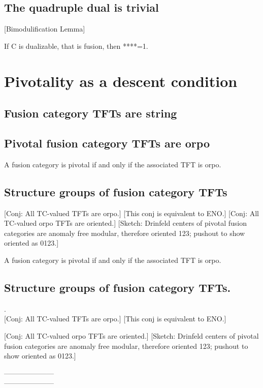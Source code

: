 \documentclass{amsart}
\begin{document}
\subsection{The quadruple dual is trivial}
[Bimodulification Lemma]
\begin{theorem} 
If C is dualizable, that is fusion, then ****=1.
\end{theorem}
%

\section{Pivotality as a descent condition}

\subsection{Fusion category TFTs are string}
\subsection{Pivotal fusion category TFTs are orpo}
\begin{theorem}
A fusion category is pivotal if and only if the associated TFT is orpo.
\end{theorem}
\subsection{Structure groups of fusion category TFTs}
   [Conj: All TC-valued TFTs are orpo.] [This conj is equivalent to ENO.]
   [Conj: All TC-valued orpo TFTs are oriented.] [Sketch: Drinfeld centers of pivotal fusion categories are anomaly free modular, therefore oriented 123; pushout to show oriented as 0123.]

\begin{theorem}
A fusion category is pivotal if and only if the associated TFT is orpo.
\end{theorem}

\subsection{Structure groups of fusion category TFTs.} .\\

	[Conj: All TC-valued TFTs are orpo.] [This conj is equivalent to ENO.]
	
	[Conj: All TC-valued orpo TFTs are oriented.] [Sketch: Drinfeld centers of pivotal fusion categories are anomaly free modular, therefore oriented 123; pushout to show oriented as 0123.]



\nid ---------------------\\
---------------------




\end{document}
